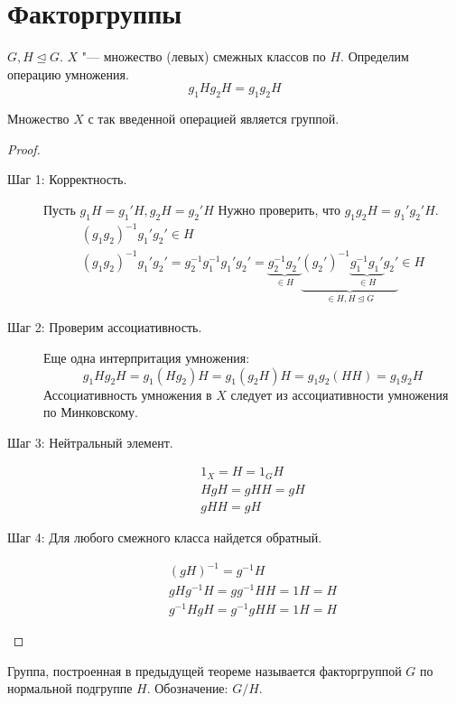 ﻿\section{Факторгруппы}

$G, H \unlhd G$.
$X$ "--- множество (левых) смежных классов по $H$.
Определим операцию умножения. 
\[ g_1H g_2H = g_1g_2H \]
\begin{theorem}
	Множество $X$ с так введенной операцией является группой. 
\end{theorem}
\begin{proof}\begin{description}
\item[Шаг 1: Корректность.]
	Пусть $g_1H = g_1'H, g_2H = g_2'H$
	Нужно проверить, что $g_1g_2H = g_1'g_2'H$.
	\begin{gather*}
		(g_1g_2)^{-1}g_1'g_2' \in H \\
		(g_1g_2)^{-1}g_1'g_2'
		= g_2^{-1}g_1^{-1}g_1'g_2'
		= \underbrace{g_2^{-1}g_2'}_{\in H} \underbrace{(g_2')^{-1} \underbrace{g_1^{-1}g_1'}_{\in H}g_2'}_{\in H, H \unlhd G} \in H
	\end{gather*}

\item[Шаг 2: Проверим ассоциативность.]
	Еще одна интерпритация умножения:
	\[ g_1Hg_2H = g_1(Hg_2)H = g_1(g_2H)H = g_1g_2(HH) = g_1g_2H \]
	Ассоциативность умножения в $X$ следует из ассоциативности умножения по Минковскому.

\item[Шаг 3: Нейтральный элемент.]
	\begin{gather*}
		1_X = H = 1_GH \\
		HgH = gHH = gH \\
		gHH = gH
	\end{gather*}

\item [Шаг 4: Для любого смежного класса найдется обратный.]
	\begin{gather*}
		(gH)^{-1} = g^{-1}H \\
		gHg^{-1}H = gg^{-1}HH = 1H = H \\
		g^{-1}HgH = g^{-1}gHH = 1H = H
	\end{gather*}
\end{description}\end{proof}

\begin{Def}
	Группа, построенная в предыдущей теореме называется факторгруппой $G$ по нормальной подгруппе $H$.
	Обозначение: $G / H$.
\end{Def}

